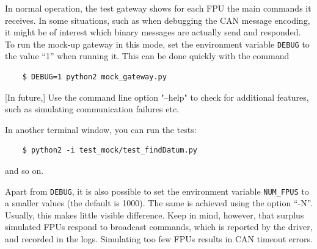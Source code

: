 \documentclass[11pt,a4paper]{report}
\begin{document}
In normal operation, the test gateway shows for each FPU the main
commands it receives. In some situations, such as when debugging the
CAN message encoding, it might be of interest which binary messages
are actually send and responded. To run the mock-up gateway in this
mode, set the environment variable \texttt{DEBUG} to the value ``1''
when running it. This can be done quickly with the command

  \begin{verbatim}
    $ DEBUG=1 python2 mock_gateway.py
  \end{verbatim}    



[In future,] Use the command line option "--help" to check for additional features,
such as simulating communication failures etc.

In another terminal window, you can run the tests:
  \begin{verbatim}
    $ python2 -i test_mock/test_findDatum.py
  \end{verbatim}    
and so on.

Apart from \texttt{DEBUG}, it is also possible to set the environment
variable \texttt{NUM\_FPUS} to a smaller values (the default is 1000).
The same is achieved using the option ``-N''.  Usually, this makes
little visible difference. Keep in mind, however, that surplus
simulated FPUs respond to broadcast commands, which is reported by the
driver, and recorded in the logs. Simulating too few FPUs results in
CAN timeout errors.

\printindex
\end{document}
